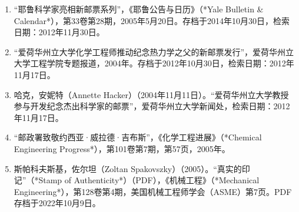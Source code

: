 \begin{enumerate}
\item “耶鲁科学家亮相新邮票系列”，《耶鲁公告与日历》（*Yale Bulletin & Calendar*），第33卷第28期，2005年5月20日。存档于2014年10月30日，检索日期：2012年11月30日。
\item “爱荷华州立大学化学工程师推动纪念热力学之父的新邮票发行”，爱荷华州立大学工程学院专题报道，2004年。存档于2012年10月30日，检索日期：2012年11月17日。
\item 哈克，安妮特（Annette Hacker）（2004年11月11日）。“爱荷华州立大学教授参与开发纪念杰出科学家的邮票”，爱荷华州立大学新闻处，检索日期：2012年11月17日。
\item “邮政署致敬约西亚·威拉德·吉布斯”，《化学工程进展》（*Chemical Engineering Progress*），第101卷第7期，第57页，2005年。
\item 斯帕科夫斯基，佐尔坦（Zoltan Spakovszky）（2005）。“真实的印记”（*Stamp of Authenticity*）（PDF），《机械工程》（*Mechanical Engineering*），第128卷第4期，美国机械工程师学会（ASME）第7页。PDF存档于2022年10月9日。

\end{enumerate}